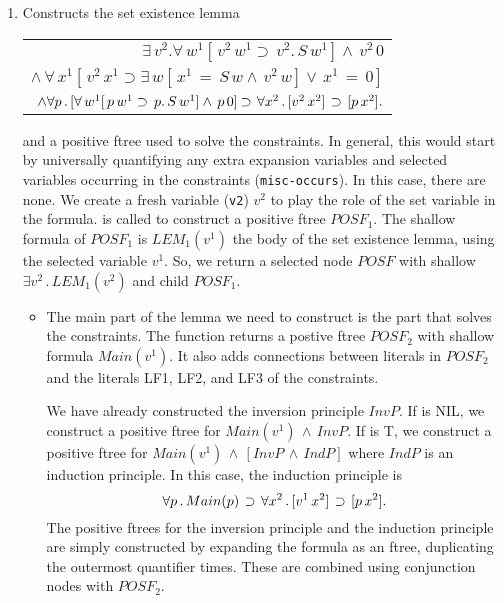 \begin{enumerate}
\item {\bf {}}  Constructs the set
existence lemma \
\begin{center}
\begin{tabular}{r}
$ \exists \,v^2 . \forall \,w^1 [ \,v^2 \,w^1 \supset \,v^2 . \,S \,w^1 ] \land \,v^2 \,0$ \\
$\land \, \forall \,x^1 [ \,v^2 \,x^1 \supset \exists \,w [ \,x^1 \,= \,S \,w \land \,v^2 \,w ] \lor \,x^1 \,= \,0 ]$ \\
$\land \forall p\, .\, [\forall \,w^1 [ \,p \,w^1 \supset \,p . \,S \,w^1 ] \land \,p \,0]
\mathbin{\supset}\, \forall x^2\, . \, [v^2\, x^2]\,\mathbin{\supset}\, [p\, x^2].$ \\
\end{tabular}
\end{center}
and a positive ftree used to solve the constraints.
In general, this would start by universally quantifying
any extra expansion variables and selected variables occurring in the constraints
(\verb+misc-occurs+).  In this case, there are none.  We create a fresh variable
(\verb+v2+) $v^2$ to play the role of the set variable in the formula.
\indexfunction{make-min-setvar-lemma-posf-1} is called to construct
a positive ftree $POSF_1$.  The shallow formula of $POSF_1$ is $LEM_1(v^1)$ the body of
the set existence lemma, using the selected variable $v^1$.
So, we return a selected node $POSF$ with shallow $\exists v^2\,.\, LEM_1(v^2)$
and child $POSF_1$.

\begin{itemize}
\item {\bf {}}
The main part of the lemma we need to construct is the part that
solves the constraints.  The function 
returns a postive ftree $POSF_2$ with shallow formula $Main(v^1)$.  It also
adds connections between literals in $POSF_2$ and the literals LF1, LF2, and LF3
of the constraints.

We have already constructed the inversion principle $InvP$.
If  is NIL, we construct a positive
ftree for $Main(v^1)\, \land \, InvP$.
If  is T, we construct a positive
ftree for $Main(v^1)\, \land \, [InvP\,\land\, IndP]$ where $IndP$ is an
induction principle.  In this case, the induction principle is
$$\forall p\, .\, Main(p)\,\mathbin{\supset}\, \forall x^2\, . \, [v^1\, x^2]\,\mathbin{\supset}\, [p\, x^2].$$
The positive ftrees for the inversion principle and the induction principle
are simply constructed by expanding the formula as an ftree, duplicating
the outermost quantifier \indexflag{NUM-OF-DUPS} times.  These are combined
using conjunction nodes with $POSF_2$.


\end{itemize}
\end{enumerate}
